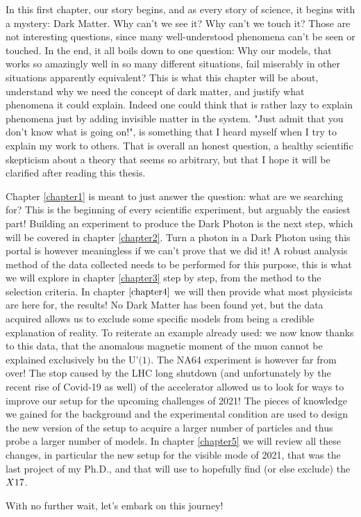 In this first chapter, our story begins, and as every story of science, it begins with a mystery: Dark Matter. Why can't we see it? Why can't we touch it? Those are not interesting questions, since many well-understood phenomena can't be seen or touched. In the end, it all boils down to one question: Why our models, that works so amazingly well in so many different situations, fail miserably in other situations apparently equivalent? This is what this chapter will be about, understand why we need the concept of dark matter, and justify what phenomena it could explain. Indeed one could think that is rather lazy to explain phenomena just by adding invisible matter in the system. "Just admit that you don't know what is going on!", is something that I heard myself when I try to explain my work to others. That is overall an honest question, a healthy scientific skepticism about a theory that seems so arbitrary, but that I hope it will be clarified after reading this thesis.

Chapter \ref{chapter1} is meant to just answer the question: what are we searching for? This is the beginning of every scientific experiment, but arguably the easiest part! Building an experiment to produce the Dark Photon is the next step, which will be covered in chapter \ref{chapter2}. Turn a photon in a Dark Photon using this portal is however meaningless if we can't prove that we did it! A robust analysis method of the data collected needs to be performed for this purpose, this is what we will explore in chapter \ref{chapter3} step by step, from the method to the selection criteria. In chapter $\ref{chapter4}$ we will then provide what most physicists are here for, the results! No Dark Matter has been found yet, but the data acquired allows us to exclude some specific models from being a credible explanation of reality. To reiterate an example already used: we now know thanks to this data, that the anomalous magnetic moment of the muon cannot be explained exclusively bu the $\textrm{U'(1)}$. The NA64 experiment is however far from over! The stop caused by the LHC long shutdown (and unfortunately by the recent rise of Covid-19 as well) of the accelerator allowed us to look for ways to improve our setup for the upcoming challenges of 2021! The pieces of knowledge we gained for the background and the experimental condition are used to design the new version of the setup to acquire a larger number of particles and thus probe a larger number of models. In chapter \ref{chapter5} we will review all these changes, in particular the new setup for the visible mode of 2021, that was the last project of my Ph.D., and that will use to hopefully find (or else exclude) the $X17$.

With no further wait, let's embark on this journey!


